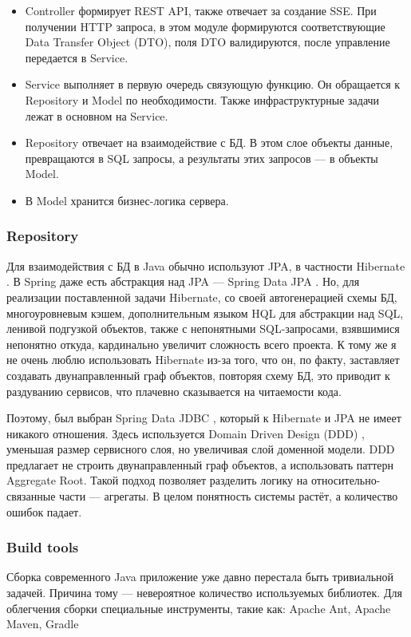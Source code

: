 \begin{itemize}
    \item Controller формирует REST API, также отвечает за создание SSE.
          При получении HTTP запроса, в этом модуле формируются соответствующие Data Transfer Object (DTO),
          поля DTO валидируются, после управление передается в Service.
    \item Service выполняет в первую очередь связующую функцию.
          Он обращается к Repository и Model по необходимости.
          Также инфраструктурные задачи лежат в основном на Service.
    \item Repository отвечает на взаимодействие с БД.
          В этом слое объекты данные, превращаются в SQL запросы, а результаты этих запросов --- в объекты Model.
    \item В Model хранится бизнес-логика сервера.
\end{itemize}

\subsubsection{Repository}
Для взаимодействия с БД в Java обычно используют JPA, в частности Hibernate \cite{HibernateReference}.
В Spring даже есть абстракция над JPA --- Spring Data JPA \cite{SpringDataJPAReference}.
Но, для реализации поставленной задачи Hibernate, со своей автогенерацией схемы БД, многоуровневым кэшем, дополнительным языком HQL для абстракции над SQL, ленивой подгузкой объектов, также с непонятными SQL-запросами, взявшимися непонятно откуда, кардинально увеличит сложность всего проекта.
К тому же я не очень люблю использовать Hibernate из-за того, что он, по факту, заставляет создавать двунаправленный граф объектов, повторяя схему БД, это приводит к раздуванию сервисов, что плачевно сказывается на читаемости кода.

Поэтому, был выбран Spring Data JDBC \cite{SpringDataJDBCReference}, который к Hibernate и JPA не имеет никакого отношения.
Здесь используется Domain Driven Design (DDD) \cite{EricEvansDDD}, уменьшая размер сервисного слоя, но увеличивая слой доменной модели.
DDD предлагает не строить двунаправленный граф объектов, а использовать паттерн Aggregate Root.
Такой подход позволяет разделить логику на относительно-связанные части --- агрегаты.
В целом понятность системы растёт, а количество ошибок падает.

\subsubsection{Build tools}
Сборка современного Java приложение уже давно перестала быть тривиальной задачей.
Причина тому --- невероятное количество используемых библиотек.
Для облегчения сборки специальные инструменты, такие как: Apache Ant, Apache Maven, Gradle

